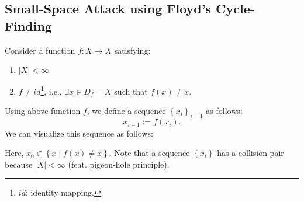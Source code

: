 \documentclass[12pt,openany]{book}
\theoremstyle{definition}
\newcommand{\set}[1]{\left\{#1\right\}}
\newcommand{\ie}{\textnormal{i.e.}}
\newcommand{\abs}[1]{\left\lvert #1 \right\rvert}
\begin{document}
	\subsection{Small-Space Attack using Floyd's Cycle-Finding}
	Consider a function $f:X\to X$ satisfying: \begin{enumerate}
		\item $\abs{X}<\infty$
		\item $f\neq id$\footnote{$id$: identity mapping.}, \ie, $\exists x\in D_f=X$ such that $f(x)\neq x$.
	\end{enumerate} Using above function $f$, we define a sequence $\set{x_i}_{i=1}$ as follows: \[
	x_{i+1}:=f(x_i).
	\] We can visualize this sequence as follows: \begin{center}
	\end{center} Here, $x_0\in\set{x\mid f(x)\neq x}$. Note that a sequence $\set{x_i}$ has a collision pair because $\abs{X}<\infty$ (feat. pigeon-hole principle).
	
\end{document}

